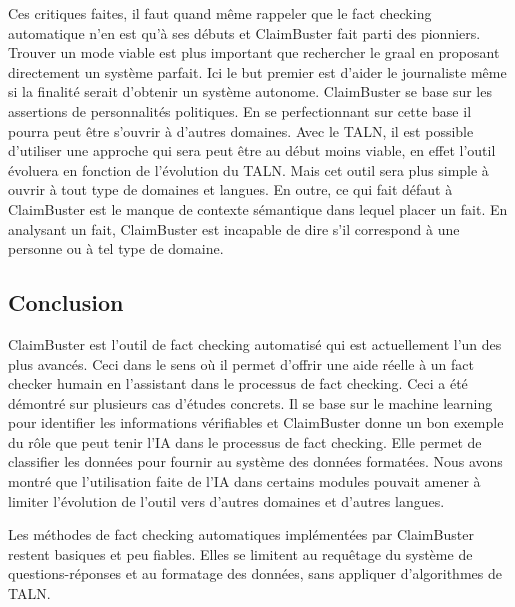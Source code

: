 Ces critiques faites, il faut quand même rappeler que le fact checking automatique n'en est qu'à ses débuts et ClaimBuster fait parti des pionniers. Trouver un mode viable est plus important que rechercher le graal en proposant directement un système parfait. Ici le but premier est d'aider le journaliste même si la finalité serait d'obtenir un système autonome. ClaimBuster se base sur les assertions de personnalités politiques. En se perfectionnant sur cette base il pourra peut être s'ouvrir à d'autres domaines. Avec le TALN, il est possible d'utiliser une approche qui sera peut être au début moins viable, en effet l'outil évoluera en fonction de l'évolution du TALN. Mais cet outil sera plus simple à ouvrir à tout type de domaines et langues. En outre, ce qui fait défaut à ClaimBuster est le manque de contexte sémantique dans lequel placer un fait. En analysant un fait, ClaimBuster est incapable de dire s'il correspond à une personne ou à tel type de domaine.

\subsection{Conclusion}

ClaimBuster est l'outil de fact checking automatisé qui est actuellement l'un des plus avancés. Ceci dans le sens où il permet d'offrir une aide réelle à un fact checker humain en l'assistant dans le processus de fact checking. Ceci a été démontré sur plusieurs cas d'études concrets. Il se base sur le machine learning pour identifier les informations vérifiables et ClaimBuster donne un bon exemple du rôle que peut tenir l'IA dans le processus de fact checking. Elle permet de classifier les données pour fournir au système des données formatées. Nous avons montré que l'utilisation faite de l'IA dans certains modules pouvait amener à limiter l'évolution de l'outil vers d'autres domaines et d'autres langues.

Les méthodes de fact checking automatiques implémentées par ClaimBuster restent basiques et peu fiables. Elles se limitent au requêtage du système de questions-réponses et au formatage des données, sans appliquer d'algorithmes de TALN.

